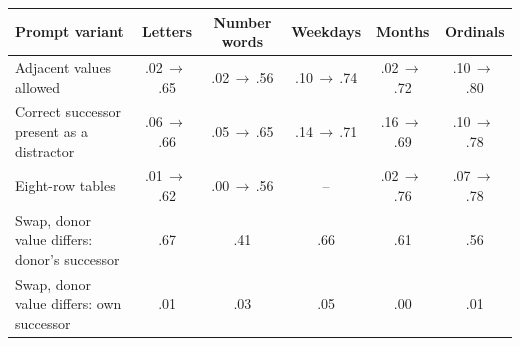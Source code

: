 \begin{tabular}{lccccc}
\toprule
Prompt variant & Letters & Number words & Weekdays & Months & Ordinals \\
\midrule
Adjacent values allowed & .02$\,\to\,$.65 & .02$\,\to\,$.56 & .10$\,\to\,$.74 & .02$\,\to\,$.72 & .10$\,\to\,$.80 \\
Correct successor present as a distractor & .06$\,\to\,$.66 & .05$\,\to\,$.65 & .14$\,\to\,$.71 & .16$\,\to\,$.69 & .10$\,\to\,$.78 \\
Eight-row tables & .01$\,\to\,$.62 & .00$\,\to\,$.56 & -- & .02$\,\to\,$.76 & .07$\,\to\,$.78 \\
\midrule
Swap, donor value differs: donor's successor & .67 & .41 & .66 & .61 & .56 \\
Swap, donor value differs: own successor & .01 & .03 & .05 & .00 & .01 \\
\bottomrule
\end{tabular}
